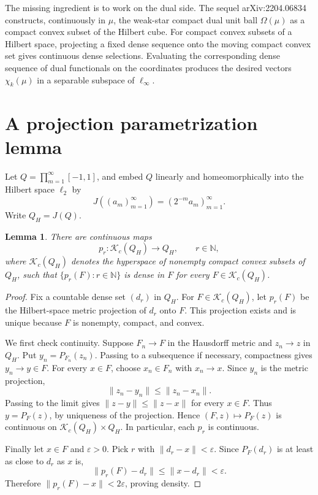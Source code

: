 \documentclass[11pt]{article}
\newtheorem{lemma}[theorem]{Lemma}
\newcommand{\Nat}{\mathbb N}
\newcommand{\K}{\mathcal K}
\begin{document}
The missing ingredient is to work on the dual side. The sequel
arXiv:2204.06834 constructs, continuously in \(\mu\), the weak-star compact
dual unit ball \(\Omega(\mu)\) as a compact convex subset of the Hilbert cube.
For compact convex subsets of a Hilbert space, projecting a fixed dense
sequence onto the moving compact convex set gives continuous dense selections.
Evaluating the corresponding dense sequence of dual functionals on the
coordinates produces the desired vectors \(\chi_k(\mu)\) in a separable
subspace of \(\ell_\infty\).

\section*{A projection parametrization lemma}

Let \(Q=\prod_{m=1}^\infty[-1,1]\), and embed \(Q\) linearly and
homeomorphically into the Hilbert space \(\ell_2\) by
\[
J((a_m)_{m=1}^\infty)=(2^{-m}a_m)_{m=1}^\infty.
\]
Write \(Q_H=J(Q)\).

\begin{lemma}
\label{lem:projection-selectors}
There are continuous maps
\[
p_r:\K_c(Q_H)\to Q_H,\qquad r\in\Nat,
\]
where \(\K_c(Q_H)\) denotes the hyperspace of nonempty compact convex subsets
of \(Q_H\), such that \(\{p_r(F):r\in\Nat\}\) is dense in \(F\) for every
\(F\in\K_c(Q_H)\).
\end{lemma}

\begin{proof}
Fix a countable dense set \((d_r)\) in \(Q_H\). For \(F\in\K_c(Q_H)\), let
\(p_r(F)\) be the Hilbert-space metric projection of \(d_r\) onto \(F\). This
projection exists and is unique because \(F\) is nonempty, compact, and convex.

We first check continuity. Suppose \(F_n\to F\) in the Hausdorff metric and
\(z_n\to z\) in \(Q_H\). Put \(y_n=P_{F_n}(z_n)\). Passing to a subsequence if
necessary, compactness gives \(y_n\to y\in F\). For every \(x\in F\), choose
\(x_n\in F_n\) with \(x_n\to x\). Since \(y_n\) is the metric projection,
\[
\|z_n-y_n\|\leq \|z_n-x_n\|.
\]
Passing to the limit gives \(\|z-y\|\leq \|z-x\|\) for every \(x\in F\).
Thus \(y=P_F(z)\), by uniqueness of the projection. Hence
\((F,z)\mapsto P_F(z)\) is continuous on \(\K_c(Q_H)\times Q_H\). In
particular, each \(p_r\) is continuous.

Finally let \(x\in F\) and \(\varepsilon>0\). Pick \(r\) with
\(\|d_r-x\|<\varepsilon\). Since \(P_F(d_r)\) is at least as close to \(d_r\)
as \(x\) is,
\[
\|p_r(F)-d_r\|\leq \|x-d_r\|<\varepsilon.
\]
Therefore \(\|p_r(F)-x\|<2\varepsilon\), proving density.
\end{proof}
\end{document}
